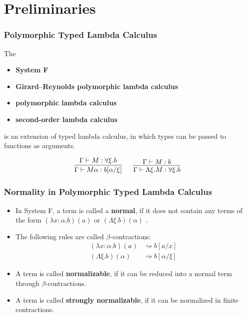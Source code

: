 

\section{Preliminaries}

\begin{frame}[fragile]
    \frametitle{Polymorphic Typed Lambda Calculus}
  
    The
    \begin{itemize}
        \item \textbf{System F}
        \item \textbf{Girard--Reynolds polymorphic lambda calculus}
        \item \textbf{polymorphic lambda calculus}
        \item \textbf{second-order lambda calculus}
    \end{itemize}
    is an extension of typed lambda calculus, in which types can be passed to functions as arguments.
  
    $$
    \begin{matrix}
    \infer{\Gamma \vdash M\alpha : b[\alpha/\xi]}{\Gamma \vdash M : \forall\xi.b}
    \ &\ 
    \infer{\Gamma \vdash \Lambda\xi. M : \forall\xi.b}{\Gamma \vdash M : b}
    \end{matrix}
    $$
\end{frame}

\begin{frame}[fragile]
    \frametitle{Normality in Polymorphic Typed Lambda Calculus}
  
    \begin{itemize}
        \item In System F, a term is called a \textbf{normal}, if it does not contain any terms of the form $(\lambda x: \alpha. b)(a)$ or $(\Lambda \xi. b)(\alpha)$  \cite{capretta_valentini_1999}.
        \item The following rules are called $\beta$-contractions:
        \begin{align*}
            (\lambda x: \alpha. b)(a) &\rightsquigarrow b [a/x] \\
            (\Lambda \xi. b)(\alpha) &\rightsquigarrow b [\alpha / \xi]
        \end{align*}
        \item A term is called \textbf{normalizable}, if it can be reduced into a normal term through $\beta$-contractions.
        \item A term is called \textbf{strongly normalizable}, if it can be normalized in finite contractions.
    \end{itemize}
\end{frame}


